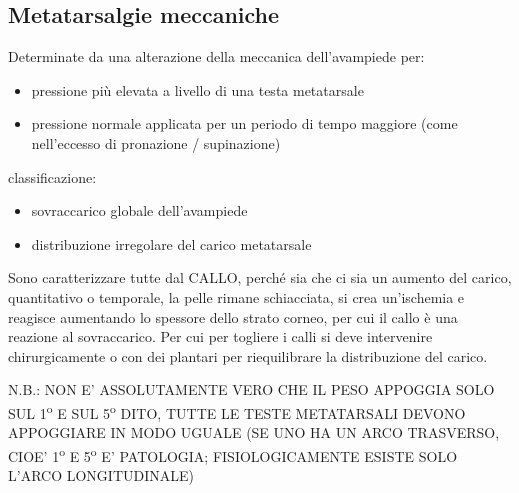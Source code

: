 \subsection{Metatarsalgie meccaniche}

Determinate da una alterazione della meccanica dell'avampiede per:
\begin{itemize}
\item pressione più elevata a livello di una testa metatarsale
\item pressione normale applicata per un periodo di tempo maggiore (come nell'eccesso di pronazione / supinazione)
\end{itemize}

classificazione:

\begin{itemize}
\item
  sovraccarico globale dell'avampiede
\item
  distribuzione irregolare del carico metatarsale
\end{itemize}

Sono caratterizzare tutte dal CALLO, perché sia che ci sia un aumento del carico, quantitativo o temporale, la pelle rimane schiacciata, si crea un'ischemia e reagisce aumentando lo spessore dello strato corneo, per cui il callo è una reazione al sovraccarico. Per cui per togliere i calli si deve intervenire chirurgicamente o con dei plantari per riequilibrare la distribuzione del carico.

N.B.: NON E' ASSOLUTAMENTE VERO CHE IL PESO APPOGGIA SOLO SUL 1\textsuperscript{o} E SUL 5\textsuperscript{o} DITO, TUTTE LE TESTE METATARSALI DEVONO APPOGGIARE IN MODO UGUALE (SE UNO HA UN ARCO TRASVERSO, CIOE' 1\textsuperscript{o} E 5\textsuperscript{o} E' PATOLOGIA; FISIOLOGICAMENTE ESISTE SOLO L'ARCO LONGITUDINALE)

